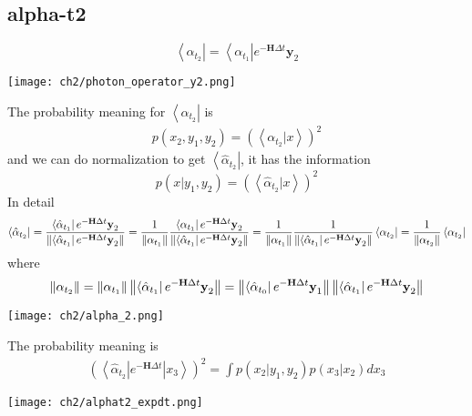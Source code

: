 \subsection{alpha-t2}
\begin{definition}
\begin{equation}
        \left< \alpha_{t_2} \right| = \left< \alpha_{t_1} \right| e^{-\textbf{H}\Delta t} \textbf{y}_2     
\end{equation}
\begin{center}
        \texttt{[image: ch2/photon\_operator\_y2.png]}   
\end{center}
The probability meaning for $\left< \alpha_{t_2}\right|$ is 
\begin{align*}
        p(x_2, y_1, y_2) = (\left< \alpha_{t_2}| x \right>)^2
\end{align*}
and we can do normalization to get $\left< \hat{\alpha}_{t_2} \right|$, it has the information
\begin{equation}
        p(x|y_1,y_2) = (\left< \hat{\alpha}_{t_2} |x\right>)^2
\end{equation}
In detail
\begin{equation}
        \left< \hat{\alpha}_{t_2} \right| 
	= \frac{\left< \hat{\alpha}_{t_1} \right| e^{-\textbf{H}\Delta t} \textbf{y}_2}{\left\lVert\left< \hat{\alpha}_{t_1} \right| e^{-\textbf{H}\Delta t} \textbf{y}_2\right\rVert} 
	= \frac{1}{\left\lVert\alpha_{t_{1}}\right\rVert} \frac{\left< \alpha_{t_1} \right| e^{-\textbf{H}\Delta t} \textbf{y}_2}{\left\lVert\left< \hat{\alpha}_{t_1} \right| e^{-\textbf{H}\Delta t} \textbf{y}_2\right\rVert} 
	= \frac{1}{\left\lVert\alpha_{t_{1}}\right\rVert} \frac{1}{\left\lVert\left< \hat{\alpha}_{t_1} \right| e^{-\textbf{H}\Delta t} \textbf{y}_2\right\rVert} \left< \alpha_{t_2} \right| 
	= \frac{1}{\left\lVert\alpha_{t_2}\right\rVert} \left< \alpha_{t_2} \right|
\end{equation}
where
\begin{equation}
        \left\lVert\alpha_{t_2}\right\rVert = \left\lVert\alpha_{t_{1}}\right\rVert \left\lVert\left< \hat{\alpha}_{t_1} \right| e^{-\textbf{H}\Delta t} \textbf{y}_2\right\rVert 
	= \left\lVert\left < \hat{\alpha}_{t_{0}} \right| e^{-\textbf{H}\Delta t} \textbf{y}_1\right\rVert \left\lVert\left< \hat{\alpha}_{t_1} \right| e^{-\textbf{H}\Delta t} \textbf{y}_2\right\rVert
\end{equation}
\begin{center}
        \texttt{[image: ch2/alpha\_2.png]}   
\end{center}
\end{definition}

\begin{definition}
The probability meaning is 
\begin{align*}
        (\left< \hat{\alpha}_{t_2}| e^{-\textbf{H}\Delta t} | x_3 \right>)^2 = \int p(x_2 | y_1, y_2) p(x_3|x_2) dx_3  
\end{align*}
\begin{center}
        \texttt{[image: ch2/alphat2\_expdt.png]}   
\end{center}
\end{definition}

